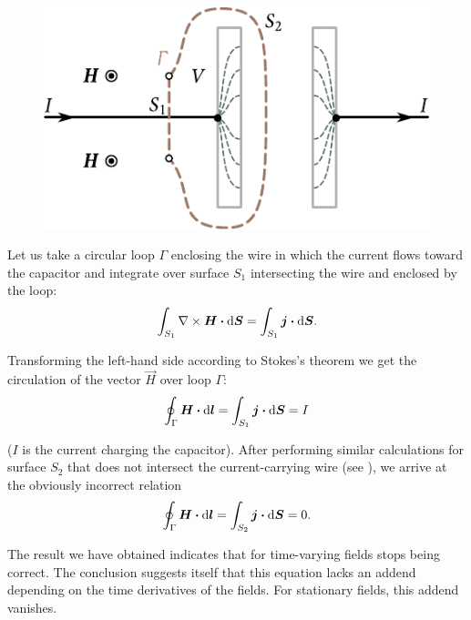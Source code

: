 \begin{figure}[t]
	\begin{center}
		\includegraphics[scale=1]{figures/ch_09/fig_9_1.pdf}
		\caption[]{}
		\label{fig:9_1}
	\end{center}
	\vspace{-0.8cm}
\end{figure}

Let us take a circular loop $\Gamma$ enclosing the wire in which the current flows toward the capacitor and integrate  over surface $S_1$ intersecting the wire and enclosed by the loop:
\begin{equation*}
    \int_{S_1} \nabla\times\boldsymbol{H} \boldsymbol{\cdot} \mathrm{d}\boldsymbol{S} = \int_{S_1} \boldsymbol{j} \boldsymbol{\cdot} \mathrm{d}\boldsymbol{S}.
\end{equation*}

\noindent
Transforming the left-hand side according to Stokes's theorem we get the circulation of the vector $\vec{H}$ over loop $\Gamma$:
\begin{equation}\label{eq:9_6}
    \oint_{\Gamma} \boldsymbol{H} \boldsymbol{\cdot} \mathrm{d}\boldsymbol{l} = \int_{S_1} \boldsymbol{j} \boldsymbol{\cdot} \mathrm{d}\boldsymbol{S} = I
\end{equation}

\noindent
($I$ is the current charging the capacitor).
After performing similar calculations for surface $S_2$ that does not intersect the current-carrying wire (see ), we arrive at the obviously incorrect relation
\begin{equation}\label{eq:9_7}
    \oint_{\Gamma} \boldsymbol{H} \boldsymbol{\cdot} \mathrm{d}\boldsymbol{l} = \int_{S_2} \boldsymbol{j} \boldsymbol{\cdot} \mathrm{d}\boldsymbol{S} = 0.
\end{equation}

\noindent
The result we have obtained indicates that for time-varying fields  stops being correct.
The conclusion suggests itself that this equation lacks an addend depending on the time derivatives of the fields.
For stationary fields, this addend vanishes.

